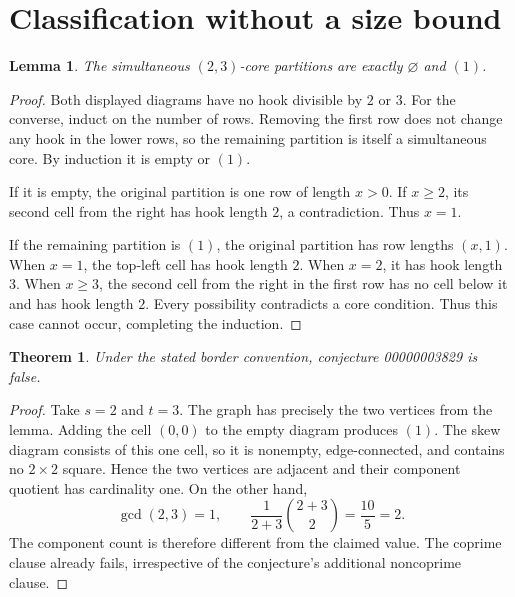 \documentclass[10pt]{article}
\newtheorem{theorem}{Theorem}
\newtheorem{lemma}{Lemma}
\begin{document}
\section{Classification without a size bound}
\begin{lemma}
The simultaneous $(2,3)$-core partitions are exactly
$\varnothing$ and $(1)$.
\end{lemma}
\begin{proof}
Both displayed diagrams have no hook divisible by $2$ or $3$.
For the converse, induct on the number of rows. Removing the first row
does not change any hook in the lower rows, so the remaining partition
is itself a simultaneous core. By induction it is empty or $(1)$.

If it is empty, the original partition is one row of length $x>0$.
If $x\ge2$, its second cell from the right has hook length $2$,
a contradiction. Thus $x=1$.

If the remaining partition is $(1)$, the original partition has row
lengths $(x,1)$. When $x=1$, the top-left cell has hook length $2$.
When $x=2$, it has hook length $3$. When $x\ge3$, the second cell
from the right in the first row has no cell below it and has hook length
$2$. Every possibility contradicts a core condition. Thus this case
cannot occur, completing the induction.
\end{proof}

\newpage
\begin{theorem}
Under the stated border convention, conjecture 00000003829 is false.
\end{theorem}
\begin{proof}
Take $s=2$ and $t=3$. The graph has precisely the two vertices from the
lemma. Adding the cell $(0,0)$ to the empty diagram produces $(1)$.
The skew diagram consists of this one cell, so it is nonempty,
edge-connected, and contains no $2\times2$ square. Hence the two vertices
are adjacent and their component quotient has cardinality one.
On the other hand,
\[
\gcd(2,3)=1,\qquad
\frac{1}{2+3}\binom{2+3}{2}=\frac{10}{5}=2.
\]
The component count is therefore different from the claimed value.
The coprime clause already fails, irrespective of the conjecture's
additional noncoprime clause.
\end{proof}
\end{document}
